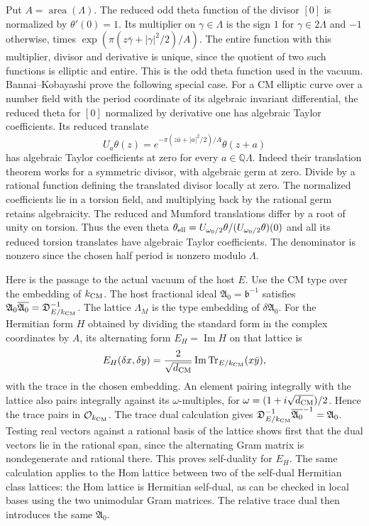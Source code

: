 Put \(A=\operatorname{area}(\Lambda)\).
The reduced odd theta function of the divisor \([0]\) is
normalized by \(\theta'(0)=1\). Its multiplier on \(\gamma\in\Lambda\)
is the sign \(1\) for \(\gamma\in 2\Lambda\) and \(-1\) otherwise,
times \(\exp(\pi(z\bar\gamma+|\gamma|^2/2)/A)\).
The entire function with this multiplier, divisor and derivative
is unique, since the quotient of two such functions is elliptic
and entire. This is the odd theta function used in the vacuum.
Bannai--Kobayashi prove the following special case. For a CM
elliptic curve over a number field with the period coordinate
of its algebraic invariant differential, the reduced theta for
\([0]\) normalized by derivative one has algebraic Taylor
coefficients. Its reduced translate
\[
 U_a\theta(z)=
     e^{-\pi(z\bar a+|a|^2/2)/A}\theta(z+a)
\]
has algebraic Taylor coefficients at zero for every
\(a\in\mathbb Q\Lambda\).
Indeed their translation theorem works for a symmetric divisor,
with algebraic germ at zero. Divide by a rational function defining
the translated divisor locally at zero. The normalized coefficients
lie in a torsion field, and multiplying back by the rational germ
retains algebraicity. The reduced and Mumford translations differ
by a root of unity on torsion.
\cite[Example~1.9, Corollary~2.2 and Theorem~2.9]{bannai-kobayashi-theta}
Thus the even theta \(\theta_{\rm ell}=U_{\omega_0/2}\theta/
(U_{\omega_0/2}\theta)(0)\) and all its reduced torsion translates
have algebraic Taylor coefficients. The denominator is nonzero
since the chosen half period is nonzero modulo \(\Lambda\).

Here is the passage to the actual vacuum of the host \(E\).
Use the CM type over the embedding of \(k_{\rm CM}\).
The host fractional ideal \(\mathfrak A_0=\mathfrak b^{-1}\)
satisfies \(\mathfrak A_0\overline{\mathfrak A_0}
=\mathfrak D_{E/k_{\rm CM}}^{-1}\).
The lattice \(\Lambda_M\) is the type embedding of
\(\delta\mathfrak A_0\). For the Hermitian form \(H\) obtained by
dividing the standard form in the complex coordinates by \(A\),
its alternating form \(E_H=\operatorname{Im}H\) on that lattice
is
\[
 E_H(\delta x,\delta y)
   = \frac{2}{\sqrt{d_{\rm CM}}}
      \operatorname{Im}\operatorname{Tr}_{E/k_{\rm CM}}(x\bar y),
\]
with the trace in the chosen embedding.
An element pairing integrally with the lattice also pairs
integrally against its \(\omega\)-multiples, for
\(\omega=(1+i\sqrt{d_{\rm CM}})/2\). Hence the trace pairs
in \(\mathcal O_{k_{\rm CM}}\). The trace dual calculation
gives \(\mathfrak D_{E/k_{\rm CM}}^{-1}
\overline{\mathfrak A_0}^{-1}=\mathfrak A_0\).
Testing real vectors against a rational basis of the lattice
shows first that the dual vectors lie in the rational span,
since the alternating Gram matrix is nondegenerate and rational
there. This proves self-duality for \(E_H\).
The same calculation applies to the Hom lattice between two
of the self-dual Hermitian class lattices: the Hom lattice is
Hermitian self-dual, as can be checked in local bases using the
two unimodular Gram matrices. The relative trace dual then
introduces the same \(\mathfrak A_0\).

